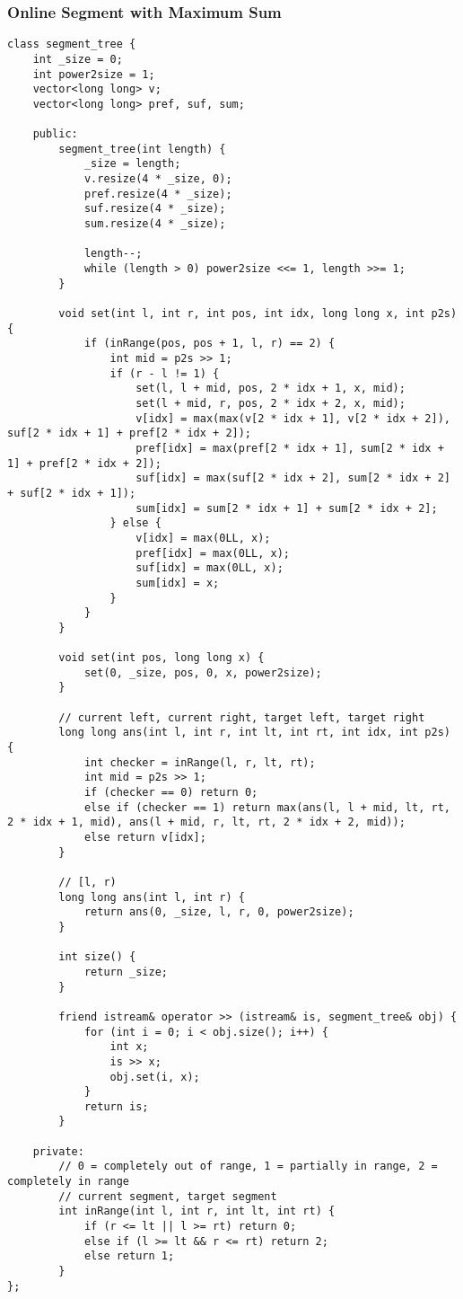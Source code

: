 \subsubsection{Online Segment with Maximum Sum}
\begin{lstlisting}
class segment_tree {
    int _size = 0;
    int power2size = 1;
    vector<long long> v;
    vector<long long> pref, suf, sum;
 
    public:
        segment_tree(int length) {
            _size = length;
            v.resize(4 * _size, 0);
            pref.resize(4 * _size);
            suf.resize(4 * _size);
            sum.resize(4 * _size);
 
            length--;
            while (length > 0) power2size <<= 1, length >>= 1;
        }
 
        void set(int l, int r, int pos, int idx, long long x, int p2s) {
            if (inRange(pos, pos + 1, l, r) == 2) {
                int mid = p2s >> 1;
                if (r - l != 1) {
                    set(l, l + mid, pos, 2 * idx + 1, x, mid);
                    set(l + mid, r, pos, 2 * idx + 2, x, mid);
                    v[idx] = max(max(v[2 * idx + 1], v[2 * idx + 2]), suf[2 * idx + 1] + pref[2 * idx + 2]);
                    pref[idx] = max(pref[2 * idx + 1], sum[2 * idx + 1] + pref[2 * idx + 2]);
                    suf[idx] = max(suf[2 * idx + 2], sum[2 * idx + 2] + suf[2 * idx + 1]);
                    sum[idx] = sum[2 * idx + 1] + sum[2 * idx + 2];
                } else {
                    v[idx] = max(0LL, x);
                    pref[idx] = max(0LL, x);
                    suf[idx] = max(0LL, x);
                    sum[idx] = x;
                }
            }
        }
 
        void set(int pos, long long x) {
            set(0, _size, pos, 0, x, power2size);
        }
 
        // current left, current right, target left, target right
        long long ans(int l, int r, int lt, int rt, int idx, int p2s) {
            int checker = inRange(l, r, lt, rt);
            int mid = p2s >> 1;
            if (checker == 0) return 0;
            else if (checker == 1) return max(ans(l, l + mid, lt, rt, 2 * idx + 1, mid), ans(l + mid, r, lt, rt, 2 * idx + 2, mid));
            else return v[idx];
        }
 
        // [l, r)
        long long ans(int l, int r) {
            return ans(0, _size, l, r, 0, power2size);
        }
        
        int size() {
            return _size;
        }
        
        friend istream& operator >> (istream& is, segment_tree& obj) {
            for (int i = 0; i < obj.size(); i++) {
                int x;
                is >> x;
                obj.set(i, x);
            }
            return is;
        }
 
    private:
        // 0 = completely out of range, 1 = partially in range, 2 = completely in range
        // current segment, target segment
        int inRange(int l, int r, int lt, int rt) {
            if (r <= lt || l >= rt) return 0;
            else if (l >= lt && r <= rt) return 2;
            else return 1;
        }
};
\end{lstlisting}